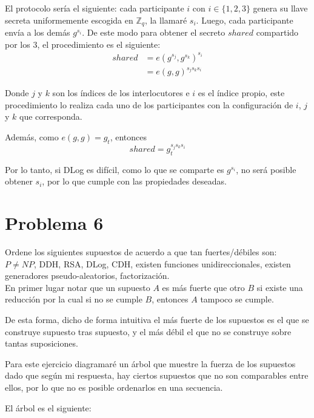 \documentclass[twoside]{tareas}
\begin{document}
\begin{enumerate}
    El protocolo sería el siguiente: cada participante $i$ con $i \in \{1, 2, 3\}$ genera su llave secreta uniformemente escogida en $\mathbb{Z}_q$, la llamaré $s_i$. Luego, cada participante envía a los demás $g^{s_i}$. De este modo para obtener el secreto $shared$ compartido por los 3, el procedimiento es el siguiente:
    \begin{align*}
        shared &= e(g^{s_j}, g^{s_k})^{s_i}\\
        &= e(g, g)^{s_j s_k s_i}
    \end{align*}

    Donde $j$ y $k$ son los índices de los interlocutores e $i$ es el índice propio, este procedimiento lo realiza cada uno de los participantes con la configuración de $i$, $j$ y $k$ que corresponda.

    Además, como $e(g, g) = g_t$, entonces
    $$shared=g_t^{s_j s_k s_i}$$

    Por lo tanto, si DLog es difícil, como lo que se comparte es $g^{s_i}$, no será posible obtener $s_i$, por lo que cumple con las propiedades deseadas.

\end{enumerate}

\section*{Problema 6}

Ordene los siguientes supuestos de acuerdo a que tan fuertes/débiles son:\\
$P \neq NP$, DDH, RSA, DLog, CDH, existen funciones unidireccionales, existen generadores pseudo-aleatorios, factorización.\\

En primer lugar notar que un supuesto $A$ es más fuerte que otro $B$ si existe una reducción por la cual si no se cumple $B$, entonces $A$ tampoco se cumple.

De esta forma, dicho de forma intuitiva el más fuerte de los supuestos es el que se construye supuesto tras supuesto, y el más débil el que no se construye sobre tantas suposiciones.

Para este ejercicio diagramaré un árbol que muestre la fuerza de los supuestos dado que según mi respuesta, hay ciertos supuestos que no son comparables entre ellos, por lo que no es posible ordenarlos en una secuencia.

El árbol es el siguiente:
\end{document}
